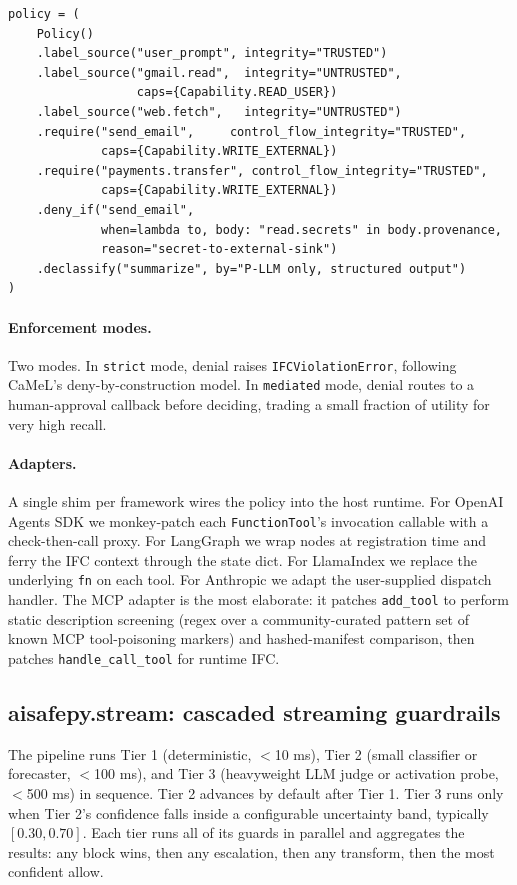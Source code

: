 \begin{lstlisting}[caption={Policy declaration in \texttt{aisafepy.flow}.}, label={lst:policy}]
policy = (
    Policy()
    .label_source("user_prompt", integrity="TRUSTED")
    .label_source("gmail.read",  integrity="UNTRUSTED",
                  caps={Capability.READ_USER})
    .label_source("web.fetch",   integrity="UNTRUSTED")
    .require("send_email",     control_flow_integrity="TRUSTED",
             caps={Capability.WRITE_EXTERNAL})
    .require("payments.transfer", control_flow_integrity="TRUSTED",
             caps={Capability.WRITE_EXTERNAL})
    .deny_if("send_email",
             when=lambda to, body: "read.secrets" in body.provenance,
             reason="secret-to-external-sink")
    .declassify("summarize", by="P-LLM only, structured output")
)
\end{lstlisting}

\paragraph{Enforcement modes.} Two modes. In \texttt{strict} mode,
denial raises \texttt{IFCViolationError}, following CaMeL's
deny-by-construction model. In \texttt{mediated} mode, denial routes
to a human-approval callback before deciding, trading a small
fraction of utility for very high recall.

\paragraph{Adapters.} A single shim per framework wires the policy
into the host runtime. For OpenAI Agents SDK we monkey-patch each
\texttt{FunctionTool}'s invocation callable with a check-then-call
proxy. For LangGraph we wrap nodes at registration time and ferry
the IFC context through the state dict. For LlamaIndex we replace
the underlying \texttt{fn} on each tool. For Anthropic we adapt the
user-supplied dispatch handler. The MCP adapter is the most
elaborate: it patches \texttt{add\_tool} to perform static
description screening (regex over a community-curated pattern set
of known MCP tool-poisoning markers) and hashed-manifest comparison,
then patches \texttt{handle\_call\_tool} for runtime IFC.

\subsection{aisafepy.stream: cascaded streaming guardrails}

The pipeline runs Tier 1 (deterministic, $<$10 ms), Tier 2 (small
classifier or forecaster, $<$100 ms), and Tier 3 (heavyweight LLM
judge or activation probe, $<$500 ms) in sequence. Tier 2 advances
by default after Tier 1. Tier 3 runs only when Tier 2's confidence
falls inside a configurable uncertainty band, typically
$[0.30, 0.70]$. Each tier runs all of its guards in parallel and
aggregates the results: any block wins, then any escalation, then
any transform, then the most confident allow.

